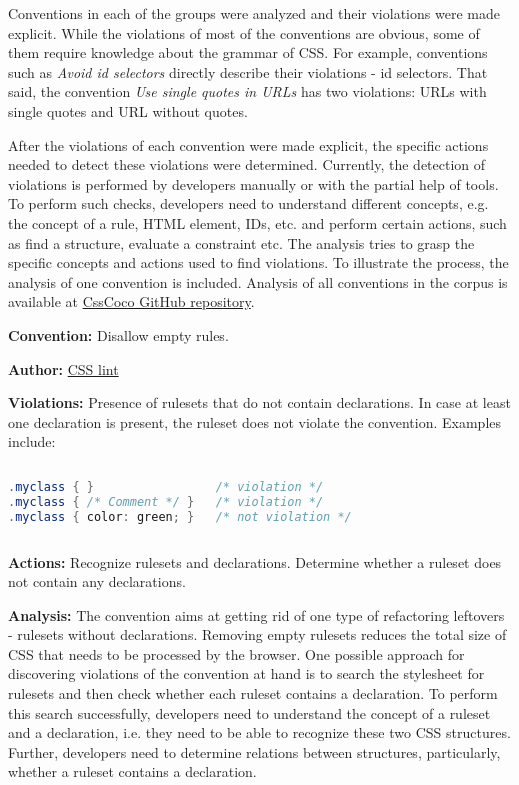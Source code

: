 Conventions in each of the groups were analyzed and their violations were made
explicit. While the violations of most of the conventions are obvious, some of
them require knowledge about the grammar of CSS. For example, conventions such
as \textit{Avoid id selectors} directly describe their violations - id
selectors. That said, the convention \textit{Use single quotes in URLs} has
two violations: URLs with single quotes and URL without quotes.

After the violations of each convention were made explicit, the specific actions needed to detect
these violations were determined. Currently, the detection of violations is performed by developers
manually or with the partial help of tools. To perform such checks, developers need to understand
different concepts, e.g. the concept of a rule, HTML element, IDs, etc. and perform certain actions,
such as find a structure, evaluate a constraint etc. The analysis tries to grasp the specific
concepts and actions used to find violations. To illustrate the process, the analysis of one convention is included. Analysis of all conventions in the corpus is available at
\href{https://github.com/boryanagoncharenko/CssCoco/blob/master/analysis.md}{CssCoco GitHub
repository}.

\begin{description}
\item\textbf{Convention:} Disallow empty rules.
\item\textbf{Author:} \href{https://github.com/CSSLint/csslint/wiki/Disallow-empty-rules}{CSS lint}
\item\textbf{Violations:} Presence of rulesets that do not contain declarations. In case at least one declaration is present, the ruleset does not violate the convention. Examples include:
\begin{sourcecode}
\begin{lstlisting}[style=mono,language=Java]
.myclass { }                 /* violation */
.myclass { /* Comment */ }   /* violation */
.myclass { color: green; }   /* not violation */
\end{lstlisting}
\end{sourcecode}

\item\textbf{Actions:} Recognize rulesets and declarations. Determine whether a ruleset does not contain any declarations.

\item\textbf{Analysis:} The convention aims at getting rid of one type of refactoring leftovers -
rulesets without declarations. Removing empty rulesets reduces the total size of CSS that
needs to be processed by the browser. One possible approach for discovering violations of the
convention at hand is to search the stylesheet for rulesets and then check whether each ruleset
contains a declaration. To perform this search successfully, developers need to understand the
concept of a ruleset and a declaration, i.e. they need to be able to recognize these two CSS
structures. Further, developers need to determine relations between structures, particularly,
whether a ruleset contains a declaration.

\end{description}


